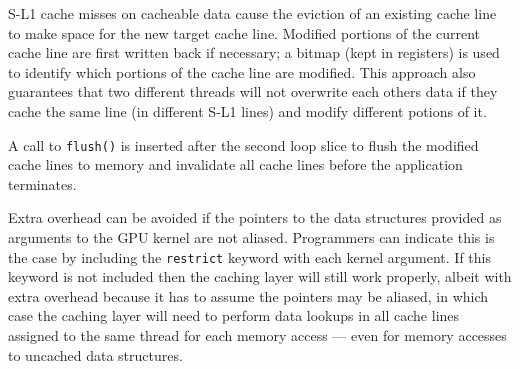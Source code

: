 %

\noindent
S-L1 cache misses on cacheable data cause the eviction of an existing cache
line to make space for the new target cache line. Modified portions of the
current cache line are first written back if necessary; a bitmap (kept in
registers) is used to identify which portions of the cache line are modified.
This approach also guarantees that two different threads will not overwrite each others data if they cache the same line (in different S-L1 lines) and
modify different potions of it.

A call to \texttt{flush()} is inserted after the second loop slice to flush the modified cache lines to memory and invalidate all cache lines before the application terminates.

Extra overhead can be avoided if the pointers to the data structures provided as arguments to the GPU
kernel are not aliased. 
Programmers can indicate this is the case by including the \texttt{restrict} keyword with each
kernel argument. 
If this keyword is not included then the caching layer will still work properly, albeit 
with extra overhead because it has to assume the pointers may be aliased,
in which case the caching layer will need to perform data lookups in all cache lines assigned to the same thread for
each memory access --- even for memory accesses to uncached data structures.



